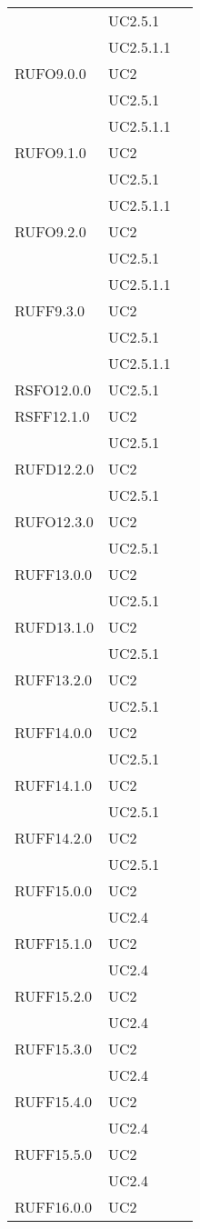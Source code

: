 \begin{center}
\begin{longtable}{lp{}l}
 & UC2.5.1 \\
 & UC2.5.1.1 \\
RUFO9.0.0 & UC2 \\
 & UC2.5.1 \\
 & UC2.5.1.1 \\
RUFO9.1.0 & UC2 \\
 & UC2.5.1 \\
 & UC2.5.1.1 \\
RUFO9.2.0 & UC2 \\
 & UC2.5.1 \\
 & UC2.5.1.1 \\
RUFF9.3.0 & UC2 \\
 & UC2.5.1 \\
 & UC2.5.1.1 \\
RSFO12.0.0 & UC2.5.1 \\
RSFF12.1.0 & UC2 \\
 & UC2.5.1 \\
RUFD12.2.0 & UC2 \\
 & UC2.5.1 \\
RUFO12.3.0 & UC2 \\
 & UC2.5.1 \\
RUFF13.0.0 & UC2 \\
 & UC2.5.1 \\
RUFD13.1.0 & UC2 \\
 & UC2.5.1 \\
RUFF13.2.0 & UC2 \\
 & UC2.5.1 \\
RUFF14.0.0 & UC2 \\
 & UC2.5.1 \\
RUFF14.1.0 & UC2 \\
 & UC2.5.1 \\
RUFF14.2.0 & UC2 \\
 & UC2.5.1 \\
RUFF15.0.0 & UC2 \\
 & UC2.4 \\
RUFF15.1.0 & UC2 \\
 & UC2.4 \\
RUFF15.2.0 & UC2 \\
 & UC2.4 \\
RUFF15.3.0 & UC2 \\
 & UC2.4 \\
RUFF15.4.0 & UC2 \\
 & UC2.4 \\
RUFF15.5.0 & UC2 \\
 & UC2.4 \\
RUFF16.0.0 & UC2 \\

\end{longtable}
\end{center}
